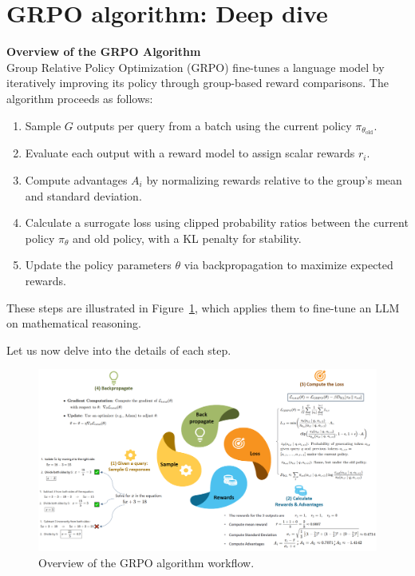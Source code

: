 \documentclass{article}
\begin{document}
\section{GRPO algorithm: Deep dive}
\label{sec:grpo_deep_dive}
\textbf{Overview of the GRPO Algorithm} \\
Group Relative Policy Optimization (GRPO) fine-tunes a language model by iteratively improving its policy through group-based reward comparisons. The algorithm proceeds as follows:
\begin{enumerate}
    \item Sample \( G \) outputs per query from a batch using the current policy \( \pi_{\theta_{\text{old}}} \).
    \item Evaluate each output with a reward model to assign scalar rewards \( r_i \).
    \item Compute advantages \( A_i \) by normalizing rewards relative to the group’s mean and standard deviation.
    \item Calculate a surrogate loss using clipped probability ratios between the current policy \( \pi_\theta \) and old policy, with a KL penalty for stability.
    \item Update the policy parameters \( \theta \) via backpropagation to maximize expected rewards.
\end{enumerate}
These steps are illustrated in Figure~\ref{grpo_diagram}, which applies them to fine-tune an LLM on mathematical reasoning.

Let us now delve into the details of each step.\\
\vspace{3mm}

\begin{figure}[h]
    \centering
    \includegraphics[width=1.05\linewidth]{my_diagram2.png}
    \caption{Overview of the GRPO algorithm workflow.}
    \label{grpo_diagram}
\end{figure}
\end{document}
